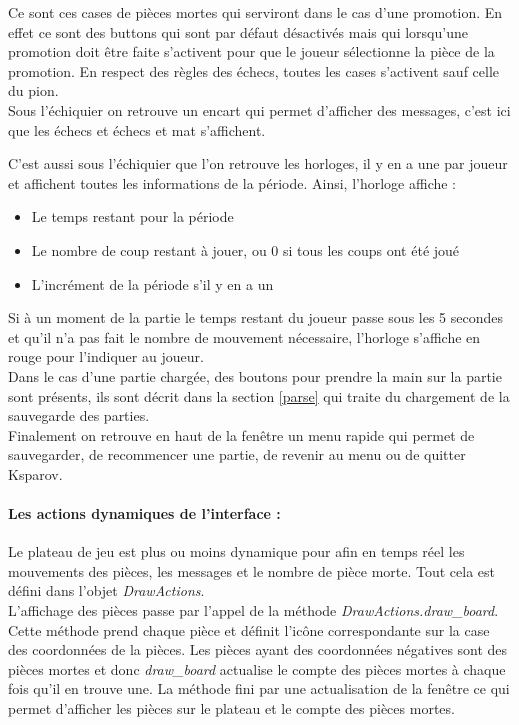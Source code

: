 \documentclass[a4paper]{article}
\begin{document}
Ce sont ces cases de pièces mortes qui serviront dans le cas d'une promotion. En effet ce sont des buttons qui sont par défaut désactivés mais qui lorsqu'une promotion doit être faite s'activent pour que le joueur sélectionne la pièce de la promotion. En respect des règles des échecs, toutes les cases s'activent sauf celle du pion. \\

Sous l'échiquier on retrouve un encart qui permet d'afficher des messages, c'est ici que les échecs et échecs et mat s'affichent.

C'est aussi sous l'échiquier que l'on retrouve les horloges, il y en a une par joueur et affichent toutes les informations de la période. Ainsi, l'horloge affiche :
\begin{itemize}
\item Le temps restant pour la période
\item Le nombre de coup restant à jouer, ou 0 si tous les coups ont été joué
\item L'incrément de la période s'il y en a un 
\end{itemize}

Si à un moment de la partie le temps restant du joueur passe sous les 5 secondes et qu'il n'a pas fait le nombre de mouvement nécessaire, l'horloge s'affiche en rouge pour l'indiquer au joueur. \\

Dans le cas d'une partie chargée, des boutons pour prendre la main sur la partie sont présents, ils sont décrit dans la section \ref{parse} qui traite du chargement de la sauvegarde des parties. \\

Finalement on retrouve en haut de la fenêtre un menu rapide qui permet de sauvegarder, de recommencer une partie, de revenir au menu ou de quitter Ksparov.

\paragraph{Les actions dynamiques de l'interface :}Le plateau de jeu est plus ou moins dynamique pour afin en temps réel les mouvements des pièces, les messages et le nombre de pièce morte. Tout cela est défini dans l'objet \textit{DrawActions}. \\

L'affichage des pièces passe par l'appel de la méthode \textit{DrawActions.draw\_board}. Cette méthode prend chaque pièce et définit l'icône correspondante sur la case des coordonnées de la pièces. Les pièces ayant des coordonnées négatives sont des pièces mortes et donc \textit{draw\_board} actualise le compte des pièces mortes à chaque fois qu'il en trouve une. La méthode fini par une actualisation de la fenêtre ce qui permet d'afficher les pièces sur le plateau et le compte des pièces mortes. \\
\end{document}
